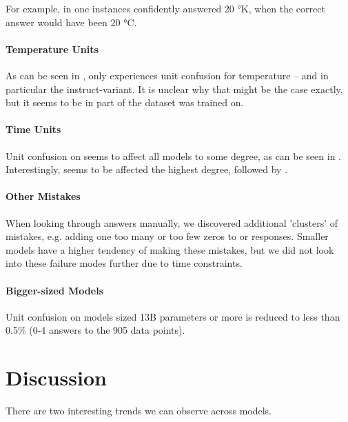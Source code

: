 For example, in one instances  confidently answered 20 °K, when the correct answer would have been 20 °C.

\paragraph{Temperature Units}
As can be seen in , only  experiences unit confusion for temperature -- and in particular the instruct-variant.
It is unclear why that might be the case exactly, but it seems to be in part of the dataset  was trained on.

\paragraph{Time Units}
Unit confusion on \ttime seems to affect all models to some degree, as can be seen in .
Interestingly,  seems to be affected the highest degree, followed by .

\paragraph{Other Mistakes}
When looking through answers manually, we discovered additional 'clusters' of mistakes, e.g. adding one too many or too few zeros to \ttime or \ttemp responses.
Smaller models have a higher tendency of making these mistakes, but we did not look into these failure modes further due to time constraints.

\paragraph{Bigger-sized Models}
Unit confusion on models sized 13B parameters or more is reduced to less than 0.5\% (0-4 answers to the 905 data points).



\section{Discussion}\label{sec:discussion}
There are two interesting trends we can observe across models.

